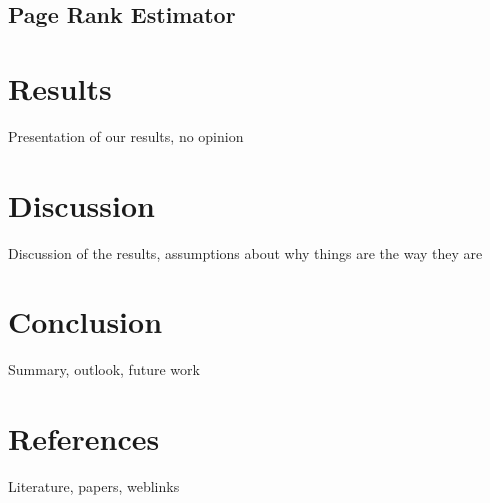 \documentclass{article}
\begin{document}
\subsection{Page Rank Estimator}
\section{Results}
Presentation of our results, no opinion

\section{Discussion}
Discussion of the results, assumptions about why things are the way they are

\section{Conclusion}
Summary, outlook, future work

\section{References}
Literature, papers, weblinks
\end{document}
